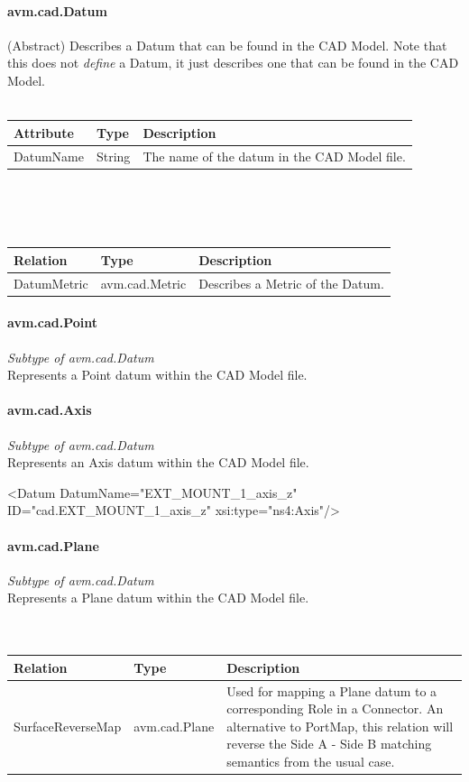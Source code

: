 \paragraph{avm.cad.Datum}
(Abstract) Describes a Datum that can be found in the CAD Model. Note that this does not \textit{define} a Datum, it just describes one that can be found in the CAD Model.
\\ \\
\begin{tabular}{ l l p{9cm} }
\textbf{Attribute} & \textbf{Type} & \textbf{Description} \\ \hline
DatumName & String & The name of the datum in the CAD Model file. \\ \hline
\end{tabular}
\\ \\ \\
\begin{tabular}{ l l p{9cm} }
\textbf{Relation} & \textbf{Type} & \textbf{Description} \\ \hline
DatumMetric & avm.cad.Metric & Describes a Metric of the Datum. \\ \hline
\end{tabular}

\paragraph{avm.cad.Point}
\textit{Subtype of avm.cad.Datum}\\
Represents a Point datum within the CAD Model file.

\paragraph{avm.cad.Axis}
\textit{Subtype of avm.cad.Datum}\\
Represents an Axis datum within the CAD Model file.

\begin{MyVerbatim}
    <Datum DatumName="EXT_MOUNT_1_axis_z" 
      ID="cad.EXT_MOUNT_1_axis_z" 
      xsi:type="ns4:Axis"/>
\end{MyVerbatim}

\paragraph{avm.cad.Plane}
\textit{Subtype of avm.cad.Datum}\\
Represents a Plane datum within the CAD Model file.
\\ \\ \\
\begin{tabular}{ l l p{9cm} }
\textbf{Relation} & \textbf{Type} & \textbf{Description} \\ \hline
SurfaceReverseMap & avm.cad.Plane & Used for mapping a Plane datum to a corresponding Role in a Connector. An alternative to PortMap, this relation will reverse the Side A - Side B matching semantics from the usual case. \\ \hline
\end{tabular}

